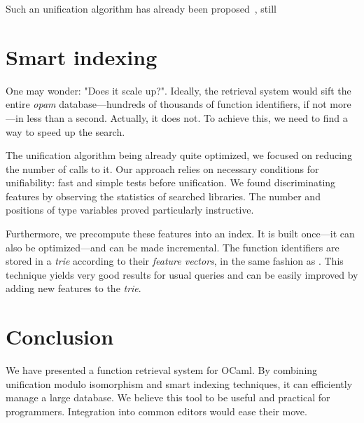 \documentclass [a4paper,11pt]{scrartcl}
\begin{document}
Such an unification algorithm has already been proposed~\cite {boudet}, still 




\section{Smart indexing}

One may wonder: "Does it scale up?". Ideally, the retrieval system would sift the entire \textit{opam} database—hundreds of thousands of function identifiers, if not more—in less than a second. Actually, it does not. To achieve this, we need to find a way to speed up the search.

The unification algorithm being already quite optimized, we focused on reducing the number of calls to it. Our approach relies on necessary conditions for unifiability: fast and simple tests before unification. We found discriminating features by observing the statistics of searched libraries. The number and positions of type variables proved particularly instructive.

Furthermore, we precompute these features into an index. It is built once—it can also be optimized—and can be made incremental. The function identifiers are stored in a \textit{trie} according to their \textit{feature vectors}, in the same fashion as \cite{schulz}. This technique yields very good results for usual queries and can be easily improved by adding new features to the \textit{trie}.


\section{Conclusion}

We have presented a function retrieval system for OCaml. By combining unification modulo isomorphism and smart indexing techniques, it can efficiently manage a large database. We believe this tool to be useful and practical for programmers. Integration into common editors would ease their move.


\printbibliography
\end{document}
